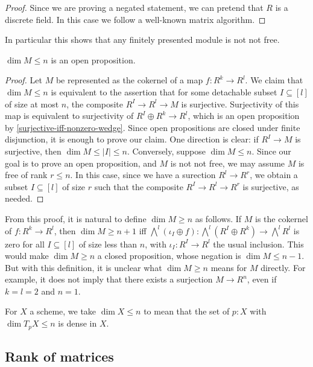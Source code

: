 \begin{proof}
Since we are proving a negated statement, we can pretend that $R$ is a discrete field.
In this case we follow a well-known matrix algorithm. %
\end{proof}
In particular this shows that any finitely presented module is not not free.
\begin{lemma}
$\dim M \le n$ is an open proposition.
\end{lemma}
\begin{proof}
Let $M$ be represented as the cokernel of a map $f : R^k \to R^l$.
We claim that $\dim M \le n$ is equivalent to the assertion that
for some detachable subset $I \subseteq [l]$ of size at most $n$,
the composite $R^I \to R^l \to M$ is surjective.
Surjectivity of this map is equivalent to surjectivity of
$R^I \oplus R^k \to R^l$, which is an
open proposition by \cref{surjective-iff-nonzero-wedge}.
Since open propositions are closed under finite disjunction, it is enough
to prove our claim.
One direction is clear: if $R^I \to M$ is surjective, then $\dim M \le |I| \le n$.
Conversely, suppose $\dim M \le n$. Since our goal is to prove an
open proposition, and $M$ is not not free, we may assume $M$ is free
of rank $r \le n$. In this case, since we have a surection $R^l \to R^r$, 
we obtain a subset $I \subseteq [l]$
of size $r$ such that the composite $R^I \to R^l \to R^r$ is surjective,
as needed.
\end{proof}

From this proof, it is natural to define $\dim M \ge n$ as follows.
If $M$ is the cokernel of $f : R^k \to R^l$, then $\dim M \ge n+1$
iff $\bigwedge^l (\iota_I \oplus f) : \bigwedge^l (R^I \oplus R^k) \to \bigwedge^l R^l$
is zero for all $I \subseteq [l]$ of size less than $n$, with $\iota_I : R^I \to R^l$
the usual inclusion. This would make $\dim M \ge n$ a closed proposition,
whose negation is $\dim M \le n-1$. But with this definition, it is unclear
what $\dim M \ge n$ means for $M$ directly. For example, it does not imply that
there exists a surjection $M \to R^n$, even if $k = l = 2$ and $n = 1$.

\begin{definition}
For $X$ a scheme, we take $\dim X \le n$ to mean that
the set of $p : X$ with $\dim T_p X \le n$ is dense in $X$.
\end{definition}


\subsection{Rank of matrices}

